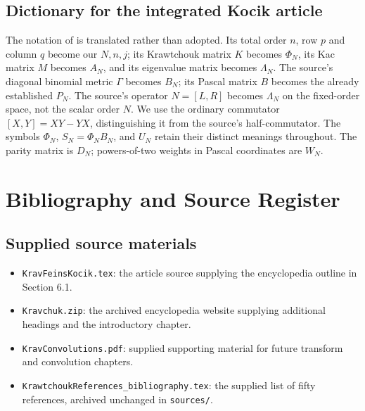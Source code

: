 \documentclass[11pt,oneside]{amsbook}
\theoremstyle{definition}
\theoremstyle{remark}
\begin{document}
\section*{Dictionary for the integrated Kocik article}
The notation of \cite{KocikFeynman} is translated rather than adopted.
Its total order $n$, row $p$ and column $q$ become our $N,n,j$;
its Krawtchouk matrix $K$ becomes $\Phi_N$, its Kac matrix $M$ becomes
$A_N$, and its eigenvalue matrix becomes $\Lambda_N$.
The source's diagonal binomial metric $\Gamma$ becomes $B_N$;
its Pascal matrix $B$ becomes the already established $P_N$.
The source's operator $N=[L,R]$ becomes $\Lambda_N$ on the fixed-order
space, not the scalar order $N$. We use the ordinary commutator
$[X,Y]=XY-YX$, distinguishing it from the source's half-commutator.
The symbols $\Phi_N$, $S_N=\Phi_NB_N$, and $U_N$ retain their distinct
meanings throughout. The parity matrix is $D_N$; powers-of-two weights
in Pascal coordinates are $W_N$.

\tableofcontents
\mainmatter



















\appendix






\backmatter
\chapter*{Bibliography and Source Register}
\section*{Supplied source materials}
\begin{itemize}
\item \texttt{KravFeinsKocik.tex}: the article source supplying the encyclopedia outline in Section 6.1.
\item \texttt{Kravchuk.zip}: the archived encyclopedia website supplying additional headings and the introductory chapter.
\item \texttt{KravConvolutions.pdf}: supplied supporting material for future transform and convolution chapters.
\item \texttt{KrawtchoukReferences\_bibliography.tex}: the supplied list of fifty references, archived unchanged in \texttt{sources/}.
\end{itemize}
\end{document}
